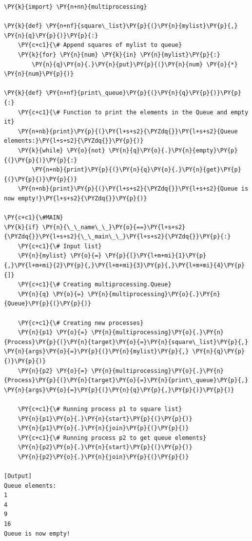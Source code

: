 \begin{Verbatim}[label=\makebox{\url{https://github.com/lucabaldini/cmepda/tree/master/slides/latex/snippets/multiprocessing_queue_passing.py}},commandchars=\\\{\}]
\PY{k}{import} \PY{n+nn}{multiprocessing}

\PY{k}{def} \PY{n+nf}{square\_list}\PY{p}{(}\PY{n}{mylist}\PY{p}{,} \PY{n}{q}\PY{p}{)}\PY{p}{:}
    \PY{c+c1}{\# Append squares of mylist to queue}
    \PY{k}{for} \PY{n}{num} \PY{k}{in} \PY{n}{mylist}\PY{p}{:}
        \PY{n}{q}\PY{o}{.}\PY{n}{put}\PY{p}{(}\PY{n}{num} \PY{o}{*} \PY{n}{num}\PY{p}{)}

\PY{k}{def} \PY{n+nf}{print\_queue}\PY{p}{(}\PY{n}{q}\PY{p}{)}\PY{p}{:}
    \PY{c+c1}{\# Function to print the elements in the Queue and empty it}
    \PY{n+nb}{print}\PY{p}{(}\PY{l+s+s2}{\PYZdq{}}\PY{l+s+s2}{Queue elements:}\PY{l+s+s2}{\PYZdq{}}\PY{p}{)}
    \PY{k}{while} \PY{o}{not} \PY{n}{q}\PY{o}{.}\PY{n}{empty}\PY{p}{(}\PY{p}{)}\PY{p}{:}
        \PY{n+nb}{print}\PY{p}{(}\PY{n}{q}\PY{o}{.}\PY{n}{get}\PY{p}{(}\PY{p}{)}\PY{p}{)}
    \PY{n+nb}{print}\PY{p}{(}\PY{l+s+s2}{\PYZdq{}}\PY{l+s+s2}{Queue is now empty!}\PY{l+s+s2}{\PYZdq{}}\PY{p}{)}

\PY{c+c1}{\#MAIN}
\PY{k}{if} \PY{n}{\_\_name\_\_}\PY{o}{==}\PY{l+s+s2}{\PYZdq{}}\PY{l+s+s2}{\_\_main\_\_}\PY{l+s+s2}{\PYZdq{}}\PY{p}{:}
    \PY{c+c1}{\# Input list}
    \PY{n}{mylist} \PY{o}{=} \PY{p}{[}\PY{l+m+mi}{1}\PY{p}{,}\PY{l+m+mi}{2}\PY{p}{,}\PY{l+m+mi}{3}\PY{p}{,}\PY{l+m+mi}{4}\PY{p}{]}
    \PY{c+c1}{\# Creating multiprocessing.Queue}
    \PY{n}{q} \PY{o}{=} \PY{n}{multiprocessing}\PY{o}{.}\PY{n}{Queue}\PY{p}{(}\PY{p}{)}

    \PY{c+c1}{\# Creating new processes}
    \PY{n}{p1} \PY{o}{=} \PY{n}{multiprocessing}\PY{o}{.}\PY{n}{Process}\PY{p}{(}\PY{n}{target}\PY{o}{=}\PY{n}{square\_list}\PY{p}{,} \PY{n}{args}\PY{o}{=}\PY{p}{(}\PY{n}{mylist}\PY{p}{,} \PY{n}{q}\PY{p}{)}\PY{p}{)}
    \PY{n}{p2} \PY{o}{=} \PY{n}{multiprocessing}\PY{o}{.}\PY{n}{Process}\PY{p}{(}\PY{n}{target}\PY{o}{=}\PY{n}{print\_queue}\PY{p}{,} \PY{n}{args}\PY{o}{=}\PY{p}{(}\PY{n}{q}\PY{p}{,}\PY{p}{)}\PY{p}{)}

    \PY{c+c1}{\# Running process p1 to square list}
    \PY{n}{p1}\PY{o}{.}\PY{n}{start}\PY{p}{(}\PY{p}{)}
    \PY{n}{p1}\PY{o}{.}\PY{n}{join}\PY{p}{(}\PY{p}{)}
    \PY{c+c1}{\# Running process p2 to get queue elements}
    \PY{n}{p2}\PY{o}{.}\PY{n}{start}\PY{p}{(}\PY{p}{)}
    \PY{n}{p2}\PY{o}{.}\PY{n}{join}\PY{p}{(}\PY{p}{)}

[Output]
Queue elements:
1
4
9
16
Queue is now empty!
\end{Verbatim}